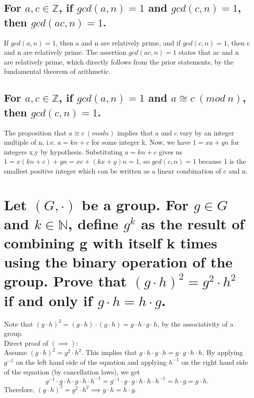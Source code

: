 \documentclass[12pt,letterpaper]{article}
\begin{document}
\subsection{For \(a,c \in \mathbb{Z}\), if \(gcd(a,n) = 1\) and \(gcd(c,n) = 1\), then \(gcd(ac,n) = 1\).}

	If \(gcd(a,n) = 1\), then a and n are relatively prime, and if \(gcd(c,n) = 1\), then c and n are relatively prime. The assertion \(gcd(ac,n) = 1\) states that ac and n are relatively prime, which directly follows from the prior statements, by the fundamental theorem of arithmetic.
	
\subsection{For \(a,c \in \mathbb{Z}\), if \(gcd(a,n) = 1\) and \(a \cong c\ (mod\ n)\), then \(gcd(c,n) = 1\).}

	The proposition that \(a \cong c\ (mod n)\) implies that a and c vary by an integer multiple of n, i.e. \(a = kn + c\) for some integer k. Now, we have \(1 = xa + yn\) for integers x,y by hypothesis. Substituting \(a = kn + c\) gives us \(1 = x(kn + c) + yn = xc + (kx+y)n = 1\), so \(gcd(c,n) = 1\) because 1 is the smallest positive integer which can be written as a linear combination of c and n.
	
\section{Let \((G, \cdot)\) be a group. For \(g \in G\) and \(k \in \mathbb{N}\), define \(g^{k}\) as the result of combining g with itself k times using the binary operation of the group. Prove that \((g \cdot h)^{2} = g^{2} \cdot h^{2}\) if and only if \(g \cdot h = h \cdot g\).}

	Note that \((g\cdot h)^{2} = (g \cdot h) \cdot (g \cdot h) = g \cdot h \cdot g \cdot h\), by the associativity of a group. \\
	
	Direct proof of \((\implies)\): \\

	Assume \((g \cdot h)^{2} = g^{2} \cdot h^{2}\). This implies that \(g\cdot h \cdot g \cdot h = g \cdot g \cdot h \cdot h\). By applying \(g^{-1}\) on the left hand side of the equation and applying \(h^{-1}\) on the right hand side of the equation (by cancellation laws), we get \[g^{-1} \cdot g\cdot h \cdot g \cdot h \cdot h^{-1} = g^{-1} \cdot g \cdot g \cdot h \cdot h \cdot h^{-1} = h \cdot g = g \cdot h.\] Therefore, \((g\cdot h)^{2} = g^{2} \cdot h^{2} \implies g \cdot h = h \cdot g. \) \\
	
\end{document}
